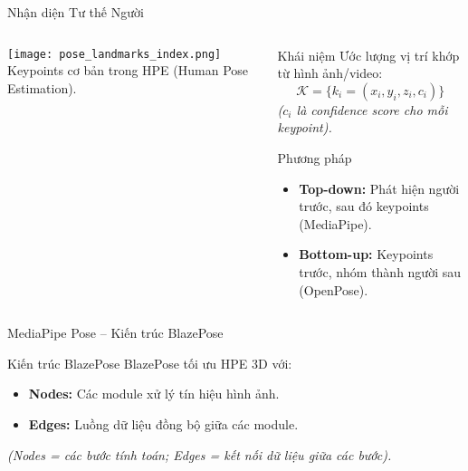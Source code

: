 \begin{frame}{Nhận diện Tư thế Người}
\begin{columns}[T]
    \begin{column}{0.45\textwidth}
        \centering
        \texttt{[image: pose\_landmarks\_index.png]}
        \vspace{0.2cm}
        {\small Keypoints cơ bản trong HPE (Human Pose Estimation).}
    \end{column}

    \begin{column}{0.55\textwidth}
        \begin{block}{Khái niệm}
            Ước lượng vị trí khớp từ hình ảnh/video:
            \[
                \mathcal{K} = \{k_i = (x_i, y_i, z_i, c_i)\}
            \]
            \small{\textit{($c_i$ là confidence score cho mỗi keypoint).}}
        \end{block}

        \begin{alertblock}{Phương pháp}
            \begin{itemize}
                \item \textbf{Top-down:} Phát hiện người trước, sau đó keypoints (MediaPipe).
                \item \textbf{Bottom-up:} Keypoints trước, nhóm thành người sau (OpenPose).
            \end{itemize}
        \end{alertblock}
    \end{column}
\end{columns}
\end{frame}

\begin{frame}{MediaPipe Pose – Kiến trúc BlazePose}
    \begin{block}{Kiến trúc BlazePose}
        BlazePose tối ưu HPE 3D với:
        \begin{itemize}
            \item \textbf{Nodes:} Các module xử lý tín hiệu hình ảnh.
            \item \textbf{Edges:} Luồng dữ liệu đồng bộ giữa các module.
        \end{itemize}
        \small{\textit{(Nodes = các bước tính toán; Edges = kết nối dữ liệu giữa các bước).}}
    \end{block}
\end{frame}


